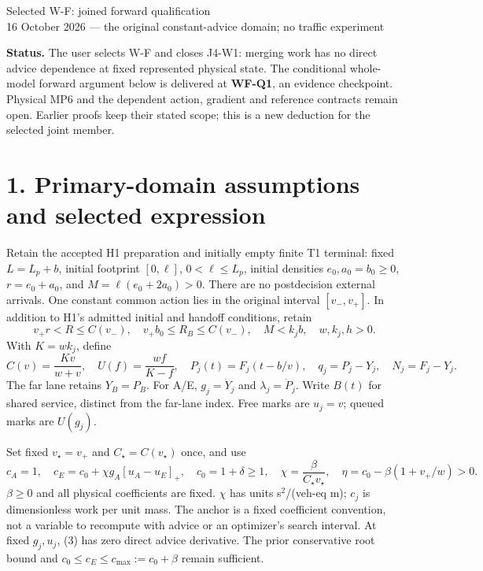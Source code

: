\documentclass[11pt,a4paper]{article}
\newcommand{\pos}[1]{[#1]_+}
\begin{document}
\begin{center}
{\Large Selected W-F: joined forward qualification}\\[4pt]
16 October 2026 --- the original constant-advice domain; no traffic experiment
\end{center}

\textbf{Status.} The user selects W-F and closes J4-W1: merging work has
no direct advice dependence at fixed represented physical state. The
conditional whole-model forward argument below is delivered at
\textbf{WF-Q1}, an evidence checkpoint. Physical MP6 and the dependent
action, gradient and reference contracts remain open. Earlier proofs keep
their stated scope; this is a new deduction for the selected joint member.

\section*{1. Primary-domain assumptions and selected expression}
Retain the accepted H1 preparation and initially empty finite T1 terminal:
fixed $L=L_p+b$, initial footprint $[0,\ell]$, $0<\ell\leq L_p$,
initial densities $e_0,a_0=b_0\geq0$, $r=e_0+a_0$, and
$M=\ell(e_0+2a_0)>0$. There are no postdecision external arrivals.
One constant common action lies in the original interval $[v_-,v_+]$.
In addition to H1's admitted initial and handoff conditions, retain
\begin{equation}
 v_+r<R\leq C(v_-),\quad v_+b_0\leq R_B\leq C(v_-),
 \quad M<k_jb,\quad w,k_j,h>0.\tag{1}
\end{equation}
With $K=wk_j$, define
\begin{equation}
 C(v)=\frac{Kv}{w+v},\quad U(f)=\frac{wf}{K-f},\quad
 P_j(t)=F_j(t-b/v),\quad q_j=P_j-Y_j,\quad N_j=F_j-Y_j.\tag{2}
\end{equation}
The far lane retains $Y_B=P_B$. For A/E, $g_j=\dot Y_j$ and
$\lambda_j=\dot P_j$. Write $B(t)$ for shared service, distinct from
the far-lane index. Free marks are $u_j=v$; queued marks are $U(g_j)$.

Set fixed $v_\star=v_+$ and $C_\star=C(v_\star)$ once, and use
\begin{equation}
 c_A=1,\quad c_E=c_0+\chi g_A\pos{u_A-u_E},\quad
 c_0=1+\delta\geq1,\quad \chi=\frac{\beta}{C_\star v_\star},\quad
 \eta=c_0-\beta(1+v_+/w)>0.\tag{3}
\end{equation}
$\beta\geq0$ and all physical coefficients are fixed. $\chi$ has units
s$^2$/(veh-eq m); $c_j$ is dimensionless work per unit mass. The anchor
is a fixed coefficient convention, not a variable to recompute with advice
or an optimizer's search interval. At fixed $g_j,u_j$, (3) has zero direct
advice derivative. The prior conservative root bound and
$c_0\leq c_E\leq c_{\max}:=c_0+\beta$ remain sufficient.
\end{document}
